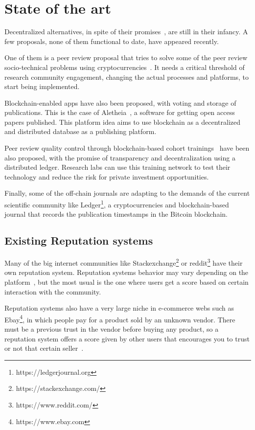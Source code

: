 \section{State of the art}


Decentralized alternatives, in spite of their
promises~\cite{bartlingblockchain}, are still in their infancy. A few proposals,
none of them functional to date, have appeared recently.

One of them is a peer review proposal that tries to solve some of the peer
review socio-technical problems using cryptocurrencies~\cite{tennant2017multi}.
It needs a critical threshold of research community engagement, changing the
actual processes and platforms, to start being implemented.

Blockchain-enabled apps have also been proposed, with voting and storage of
publications. This is the case of Aletheia~\cite{morton2017aletheia}, a software
for getting open access papers published. This platform idea aims to use
blockchain as a decentralized and distributed database as a publishing platform.

Peer review quality control through blockchain-based cohort
trainings~\cite{dhillon2016bench} have been also proposed, with the promise of
transparency and decentralization using a distributed ledger. Research labs can
use this training network to test their technology and reduce the risk for
private investment opportunities.

Finally, some of the off-chain journals are adapting to the demands of the
current scientific community like Ledger\footnote{https://ledgerjournal.org}, a
cryptocurrencies and blockchain-based journal that records the publication
timestamps in the Bitcoin blockchain.

\subsection{Existing Reputation systems}
\label{soa:rs}
Many of the big internet communities like
Stackexchange\footnote{https://stackexchange.com/} or
reddit\footnote{https://www.reddit.com/} have their own reputation system.
Reputation systems behavior may vary depending on the
platform~\cite{josang2002beta}, but the most usual is the one where users get a
score based on certain interaction with the community.

Reputation systems also have a very large niche in e-commerce webs such as
Ebay\footnote{https://www.ebay.com}, in which people pay for a product sold by
an unknown vendor. There must be a previous trust in the vendor before buying
any product, so a reputation system offers a score given by other users that
encourages you to trust or not that certain seller~\cite{resnick2002trust}.

